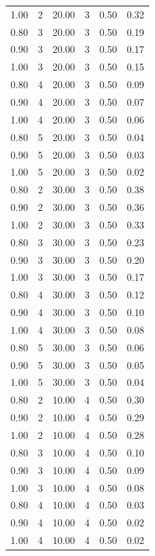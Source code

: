 \documentclass[12pt]{article}
\begin{document}
{\begin{longtable}{cccccc}
  1.00 &   2 & 20.00 &   3 & 0.50 & 0.32 \\ 
  0.80 &   3 & 20.00 &   3 & 0.50 & 0.19 \\ 
  0.90 &   3 & 20.00 &   3 & 0.50 & 0.17 \\ 
  1.00 &   3 & 20.00 &   3 & 0.50 & 0.15 \\ 
  0.80 &   4 & 20.00 &   3 & 0.50 & 0.09 \\ 
  0.90 &   4 & 20.00 &   3 & 0.50 & 0.07 \\ 
  1.00 &   4 & 20.00 &   3 & 0.50 & 0.06 \\ 
  0.80 &   5 & 20.00 &   3 & 0.50 & 0.04 \\ 
  0.90 &   5 & 20.00 &   3 & 0.50 & 0.03 \\ 
  1.00 &   5 & 20.00 &   3 & 0.50 & 0.02 \\ 
  0.80 &   2 & 30.00 &   3 & 0.50 & 0.38 \\ 
  0.90 &   2 & 30.00 &   3 & 0.50 & 0.36 \\ 
  1.00 &   2 & 30.00 &   3 & 0.50 & 0.33 \\ 
  0.80 &   3 & 30.00 &   3 & 0.50 & 0.23 \\ 
  0.90 &   3 & 30.00 &   3 & 0.50 & 0.20 \\ 
  1.00 &   3 & 30.00 &   3 & 0.50 & 0.17 \\ 
  0.80 &   4 & 30.00 &   3 & 0.50 & 0.12 \\ 
  0.90 &   4 & 30.00 &   3 & 0.50 & 0.10 \\ 
  1.00 &   4 & 30.00 &   3 & 0.50 & 0.08 \\ 
  0.80 &   5 & 30.00 &   3 & 0.50 & 0.06 \\ 
  0.90 &   5 & 30.00 &   3 & 0.50 & 0.05 \\ 
  1.00 &   5 & 30.00 &   3 & 0.50 & 0.04 \\ 
  0.80 &   2 & 10.00 &   4 & 0.50 & 0.30 \\ 
  0.90 &   2 & 10.00 &   4 & 0.50 & 0.29 \\ 
  1.00 &   2 & 10.00 &   4 & 0.50 & 0.28 \\ 
  0.80 &   3 & 10.00 &   4 & 0.50 & 0.10 \\ 
  0.90 &   3 & 10.00 &   4 & 0.50 & 0.09 \\ 
  1.00 &   3 & 10.00 &   4 & 0.50 & 0.08 \\ 
  0.80 &   4 & 10.00 &   4 & 0.50 & 0.03 \\ 
  0.90 &   4 & 10.00 &   4 & 0.50 & 0.02 \\ 
  1.00 &   4 & 10.00 &   4 & 0.50 & 0.02 \\ 

\end{longtable}}
\end{document}
